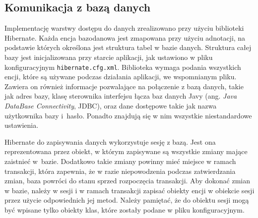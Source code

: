 \documentclass[a4paper]{book}
\newcommand{\obcy}[2]{{\selectlanguage{#1}#2}}
\newcommand{\ang}[1]{\emph{\obcy{british}{#1}}}
\begin{document}
{\subsection{Komunikacja z bazą danych}
\label{komunikacjazbaza}
Implementację warstwy dostępu do danych zrealizowano przy użyciu biblioteki Hibernate. Każda encja bazodanowa jest zmapowana przy użyciu adnotacji, na podstawie których określona jest struktura tabel w bazie danych. Struktura całej bazy jest inicjalizowana przy starcie aplikacji, jak ustawiono w pliku konfiguracyjnym \lstinline|hibernate.cfg.xml|. Biblioteka wymaga podania wszystkich encji, które są używane podczas działania aplikacji, we wspomnianym pliku. Zawiera on również informacje pozwalające na połączenie z bazą danych, takie jak adres bazy, klasę sterownika interfejsu łącza baz danych Javy (ang. \ang{Java DataBase Connectivity}, JDBC), oraz dane dostępowe takie jak nazwa użytkownika bazy i~hasło. Ponadto znajdują się w nim wszystkie niestandardowe ustawienia.

Hibernate do zapisywania danych wykorzystuje sesję z bazą. Jest ona reprezentowana przez obiekt, w którym zapisywane są wszystkie zmiany mające zaistnieć w~bazie. Dodatkowo takie zmiany powinny mieć miejsce w ramach transakcji, która zapewnia, że w razie niepowodzenia podczas zatwierdzania zmian, baza   powróci do stanu sprzed rozpoczęcia transakcji. Aby dokonać zmian w bazie, należy w sesji i w ramach transakcji zapisać obiekty encji w obiekcie sesji przez użycie odpowiednich jej metod. Należy pamiętać, że do obiektu sesji mogą być wpisane tylko obiekty klas, które zostały podane w pliku konfiguracyjnym.

}
\end{document}
